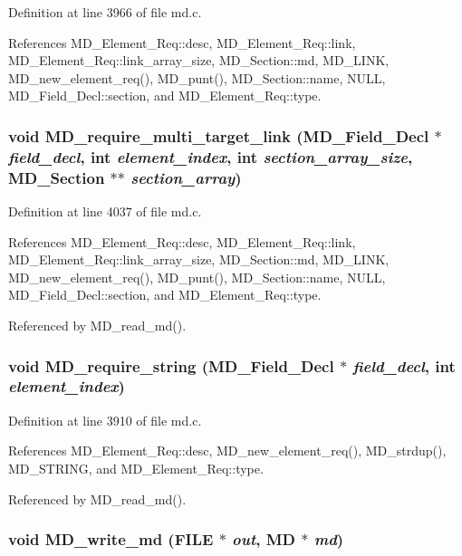 Definition at line 3966 of file md.c.

References MD\_\-Element\_\-Req::desc, MD\_\-Element\_\-Req::link, MD\_\-Element\_\-Req::link\_\-array\_\-size, MD\_\-Section::md, MD\_\-LINK, MD\_\-new\_\-element\_\-req(), MD\_\-punt(), MD\_\-Section::name, NULL, MD\_\-Field\_\-Decl::section, and MD\_\-Element\_\-Req::type.
\subsubsection{\setlength{\rightskip}{0pt plus 5cm}void MD\_\-require\_\-multi\_\-target\_\-link (\bf{MD\_\-Field\_\-Decl} $\ast$ {\em field\_\-decl}, int {\em element\_\-index}, int {\em section\_\-array\_\-size}, \bf{MD\_\-Section} $\ast$$\ast$ {\em section\_\-array})}\label{md_8h_6db7feb559876c9ccc075a0756c4fb93}




Definition at line 4037 of file md.c.

References MD\_\-Element\_\-Req::desc, MD\_\-Element\_\-Req::link, MD\_\-Element\_\-Req::link\_\-array\_\-size, MD\_\-Section::md, MD\_\-LINK, MD\_\-new\_\-element\_\-req(), MD\_\-punt(), MD\_\-Section::name, NULL, MD\_\-Field\_\-Decl::section, and MD\_\-Element\_\-Req::type.

Referenced by MD\_\-read\_\-md().
\subsubsection{\setlength{\rightskip}{0pt plus 5cm}void MD\_\-require\_\-string (\bf{MD\_\-Field\_\-Decl} $\ast$ {\em field\_\-decl}, int {\em element\_\-index})}\label{md_8h_a96bd277bec6297de1464775cba610de}




Definition at line 3910 of file md.c.

References MD\_\-Element\_\-Req::desc, MD\_\-new\_\-element\_\-req(), MD\_\-strdup(), MD\_\-STRING, and MD\_\-Element\_\-Req::type.

Referenced by MD\_\-read\_\-md().
\subsubsection{\setlength{\rightskip}{0pt plus 5cm}void MD\_\-write\_\-md (FILE $\ast$ {\em out}, \bf{MD} $\ast$ {\em md})}\label{md_8h_08198a382f6e7b587c2a239dcb3af660}




